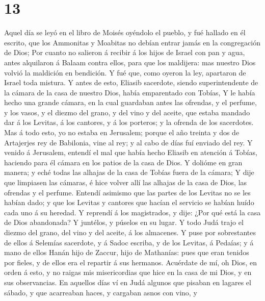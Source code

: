 \hypertarget{section-12}{%
\section{13}\label{section-12}}

 Aquel día se leyó en el libro de Moisés oyéndolo el
pueblo, y fué hallado en él escrito, que los Ammonitas y Moabitas no
debían entrar jamás en la congregación de Dios;  Por
cuanto no salieron á recibir á los hijos de Israel con pan y agua, antes
alquilaron á Balaam contra ellos, para que los maldijera: mas nuestro
Dios volvió la maldición en bendición.  Y fué que, como
oyeron la ley, apartaron de Israel toda mistura.  Y antes
de esto, Eliasib sacerdote, siendo superintendente de la cámara de la
casa de nuestro Dios, había emparentado con Tobías,  Y le
había hecho una grande cámara, en la cual guardaban antes las ofrendas,
y el perfume, y los vasos, y el diezmo del grano, y del vino y del
aceite, que estaba mandado dar á los Levitas, á los cantores, y á los
porteros; y la ofrenda de los sacerdotes.  Mas á todo
esto, yo no estaba en Jerusalem; porque el año treinta y dos de
Artajerjes rey de Babilonia, vine al rey; y al cabo de días fuí enviado
del rey.  Y venido á Jerusalem, entendí el mal que había
hecho Eliasib en atención á Tobías, haciendo para él cámara en los
patios de la casa de Dios.  Y dolióme en gran manera; y
eché todas las alhajas de la casa de Tobías fuera de la cámara;
 Y dije que limpiasen las cámaras, é hice volver allí las
alhajas de la casa de Dios, las ofrendas y el perfume. 
Entendí asimismo que las partes de los Levitas no se les habían dado; y
que los Levitas y cantores que hacían el servicio se habían huído cada
uno á su heredad.  Y reprendí á los magistrados, y dije:
¿Por qué está la casa de Dios abandonada? Y juntélos, y púselos en su
lugar.  Y todo Judá trajo el diezmo del grano, del vino y
del aceite, á los almacenes.  Y puse por sobrestantes de
ellos á Selemías sacerdote, y á Sadoc escriba, y de los Levitas, á
Pedaías; y á mano de ellos Hanán hijo de Zaccur, hijo de Mathanías: pues
que eran tenidos por fieles, y de ellos era el repartir á sus hermanos.
 Acuérdate de mí, oh Dios, en orden á esto, y no raigas
mis misericordias que hice en la casa de mi Dios, y en sus observancias.
 En aquellos días ví en Judá algunos que pisaban en
lagares el sábado, y que acarreaban haces, y cargaban asnos con vino, y
